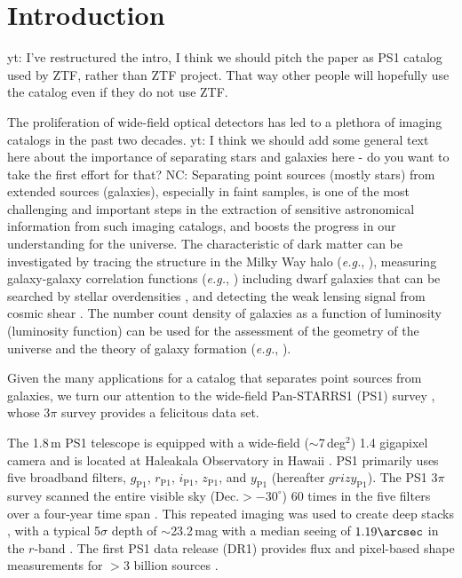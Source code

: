 \documentclass[twocolumn, dvipdfmx]{aastex62}
\newcommand{\yutaro}[1]{{\color{red} yt: {#1}}}
\newcommand{\NC}[1]{{\color{brown} NC: {#1}}}
\begin{document}

\section{Introduction}\label{sec:intro}

\yutaro{I've restructured the intro, I think we should pitch the paper as PS1
catalog used by ZTF, rather than ZTF project. That way other people will
hopefully use the catalog even if they do not use ZTF.}

The proliferation of wide-field optical detectors has led to a plethora of
imaging catalogs in the past two decades. \yutaro{I think we should add some
general text here about the importance of separating stars and galaxies here
- do you want to take the first effort for that?}
\NC{
Separating point sources (mostly stars) from extended sources (galaxies), 
especially in faint samples, 
is one of the most challenging and important steps in the 
extraction of sensitive astronomical information 
from such imaging catalogs, 
and boosts the progress in our understanding for the universe. 
The characteristic of dark matter can be investigated 
by tracing the structure in the Milky Way halo ({\it e.g.}, \citealt{Belokurov06}), 
measuring galaxy-galaxy correlation functions ({\it e.g.}, \citealt{Ross11, Ho15})
including dwarf galaxies that can be searched by stellar overdensities \citep{Belokurov07}, 
and detecting the weak lensing signal from cosmic shear \citep{Soumagnac15}. 
The number count density of galaxies as a function of luminosity (luminosity function) 
can be used for the assessment of the geometry of the universe \citep{Yasuda01} 
and the theory of galaxy formation ({\it e.g.}, \citealt{Loveday12, Moorman15}). 
}

Given the many applications for a catalog that separates point sources from
galaxies, we turn our attention to the wide-field Pan-STARRS1 (PS1) survey
\citep{Chambers16}, whose 3$\pi$ survey provides a felicitous data set.

The 1.8\,m PS1 telescope is equipped with a wide-field ($\sim$7\,deg$^2$) 1.4
gigapixel camera and is located at Haleakala Observatory in Hawaii
\citep{Hodapp04}. PS1 primarily uses five broadband filters,
$g_{\mathrm{P1}}$, $r_{\mathrm{P1}}$, $i_{\mathrm{P1}}$, $z_{\mathrm{P1}}$,
and $y_{\mathrm{P1}}$ (hereafter $grizy_{\mathrm{P1}}$). The PS1 3$\pi$
survey scanned the entire visible sky ($\mathrm{Dec.}>-30^\circ$) 60 times in
the five filters over a four-year time span \citep{Chambers16}. This repeated
imaging was used to create deep stacks \citep{Magnier16b}, with a typical
5$\sigma$ depth of $\sim$23.2\,mag with a median seeing of $1.19\arcsec$ in
the $r$-band \citep{Tonry12, Schlafly12, Chambers16}. The first PS1 data
release (DR1) provides flux and pixel-based shape measurements for $>$3
billion sources \citep{Flewelling16}.
\end{document}
